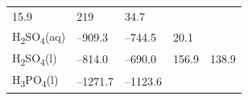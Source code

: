 \documentclass[
]{book}
\theoremstyle{definition}
\theoremstyle{definition}
\theoremstyle{definition}
\theoremstyle{remark}
\begin{document}
\begin{longtable}[]{@{}lllll@{}}
\begin{minipage}[t]{0.20\columnwidth}
15.9\strut
\end{minipage} & \begin{minipage}[t]{0.18\columnwidth}\raggedright
219\strut
\end{minipage} & \begin{minipage}[t]{0.18\columnwidth}\raggedright
34.7\strut
\end{minipage}\tabularnewline
\begin{minipage}[t]{0.10\columnwidth}\raggedright
H\textsubscript{2}SO\textsubscript{4}(aq)\strut
\end{minipage} & \begin{minipage}[t]{0.19\columnwidth}\raggedright
--909.3\strut
\end{minipage} & \begin{minipage}[t]{0.20\columnwidth}\raggedright
--744.5\strut
\end{minipage} & \begin{minipage}[t]{0.18\columnwidth}\raggedright
20.1\strut
\end{minipage} & \begin{minipage}[t]{0.18\columnwidth}\raggedright
\strut
\end{minipage}\tabularnewline
\begin{minipage}[t]{0.10\columnwidth}\raggedright
H\textsubscript{2}SO\textsubscript{4}(l)\strut
\end{minipage} & \begin{minipage}[t]{0.19\columnwidth}\raggedright
--814.0\strut
\end{minipage} & \begin{minipage}[t]{0.20\columnwidth}\raggedright
--690.0\strut
\end{minipage} & \begin{minipage}[t]{0.18\columnwidth}\raggedright
156.9\strut
\end{minipage} & \begin{minipage}[t]{0.18\columnwidth}\raggedright
138.9\strut
\end{minipage}\tabularnewline
\begin{minipage}[t]{0.10\columnwidth}\raggedright
H\textsubscript{3}PO\textsubscript{4}(l)\strut
\end{minipage} & \begin{minipage}[t]{0.19\columnwidth}\raggedright
--1271.7\strut
\end{minipage} & \begin{minipage}[t]{0.20\columnwidth}\raggedright
--1123.6\strut
\end{minipage} & \begin{minipage}[t]{0.18\columnwidth}\raggedright

\end{minipage}
\end{longtable}
\end{document}
